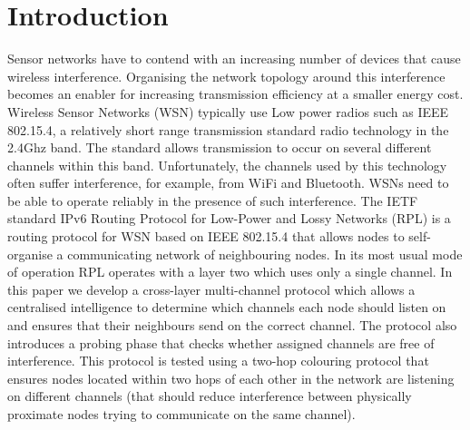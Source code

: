 \section{Introduction}
\label{sec:introduction}

Sensor networks have to contend with an increasing number of devices that cause wireless interference. Organising the network topology around this interference becomes an enabler for increasing transmission efficiency at a smaller energy cost. Wireless Sensor Networks (WSN) typically use Low power radios such as IEEE 802.15.4, a relatively short range transmission standard radio technology in the 2.4Ghz band. The standard allows transmission to occur on several different channels within this band.  Unfortunately, the
channels used by this technology often suffer interference, for example, from WiFi and Bluetooth.  WSNs need to be
able to operate reliably in the presence of such interference.  The IETF standard IPv6 Routing Protocol for Low-Power and Lossy Networks (RPL) is a routing protocol for WSN based on IEEE 802.15.4 that allows nodes to self-organise a communicating network of neighbouring nodes. In
its most usual mode of operation RPL operates with a layer two which uses only a single channel. In this paper we develop a cross-layer multi-channel
protocol which allows a centralised intelligence to determine which channels each node should listen on and ensures that their neighbours send on the correct channel. The protocol also introduces a probing phase that checks whether assigned channels are free of interference. This protocol is tested using a two-hop colouring protocol that ensures nodes located within two hops of each other in the network are listening on different channels (that should reduce interference between physically proximate nodes trying to communicate on the same channel).  


